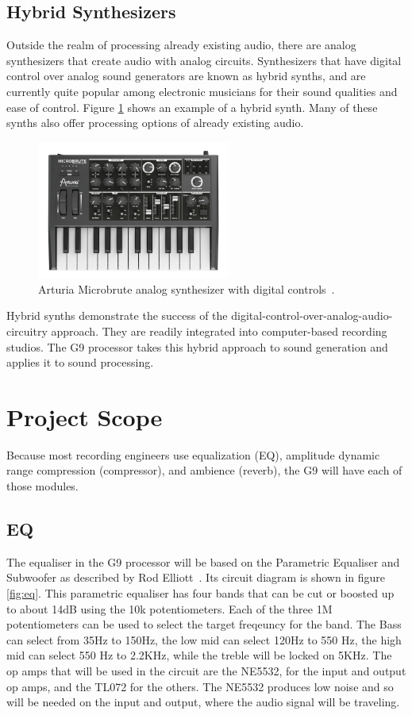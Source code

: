 \documentclass[journal]{IEEEtran}
\begin{document}
	\subsection{Hybrid Synthesizers}
	Outside the realm of processing already existing audio, there are analog synthesizers that create audio with analog circuits. Synthesizers that have digital control over analog sound generators are known as hybrid synths, and are currently quite popular among electronic musicians for their sound qualities and ease of control. Figure \ref{fig:analogSynth} shows an example of a hybrid synth. Many of these synths also offer processing options of already existing audio.
	
	\begin{figure}
		\centering
		\includegraphics[width=2.5in]{analogSynth}
		\caption{Arturia Microbrute analog synthesizer with digital controls~\cite{analogSynth}. }
		\label{fig:analogSynth}
	\end{figure}
	
	Hybrid synths demonstrate the success of the digital-control-over-analog-audio-circuitry approach. They are readily integrated into computer-based recording studios. The G9 processor takes this hybrid approach to sound generation and applies it to sound processing.
	
	
	
	\section{Project Scope}
	
	Because most recording engineers use equalization (EQ), amplitude dynamic range compression (compressor), and ambience (reverb), the G9 will have each of those modules.
	
	\subsection{EQ}
	The equaliser in the G9 processor will be based on the Parametric Equaliser and Subwoofer as described by Rod Elliott~\cite{espEq}.  Its circuit diagram is shown in figure \ref{fig:eq}.  This parametric equaliser has four bands that can be cut or boosted up to about 14dB using the 10k potentiometers.  Each of the three 1M potentiometers can be used to select the target freqeuncy for the band.  The Bass can select from 35Hz to 150Hz, the low mid can select 120Hz to 550 Hz, the high mid can select 550 Hz to 2.2KHz, while the treble will be locked on 5KHz.  The op amps that will be used in the circuit are the NE5532, for the input and output op amps, and the TL072 for the others.  The NE5532 produces low noise and so will be needed on the input and output, where the audio signal will be traveling.
	
\end{document}
